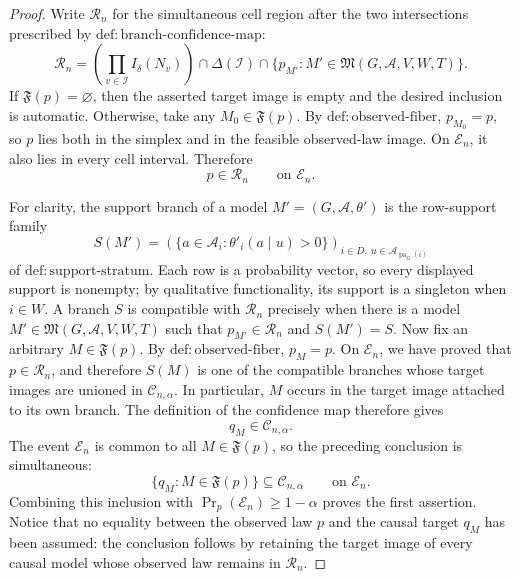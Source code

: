 \documentclass{article}
\begin{document}
\begin{proof}
Write \(\mathcal R_n\) for the simultaneous cell region after the two intersections prescribed by \(\mathrm{def:branch\text{-}confidence\text{-}map}\):
\[
 \mathcal R_n=
 \left(\prod_{v\in\mathcal I}I_\delta(N_v)\right)
 \cap\Delta(\mathcal I)
 \cap\{p_{M'}:M'\in\mathfrak M(G,\mathcal A,V,W,T)\}.
\]
If \(\mathfrak F(p)=\varnothing\), then the asserted target image is empty and the desired inclusion is automatic.  Otherwise, take any \(M_0\in\mathfrak F(p)\).  By \(\mathrm{def:observed\text{-}fiber}\), \(p_{M_0}=p\), so \(p\) lies both in the simplex and in the feasible observed-law image.  On \(\mathcal E_n\), it also lies in every cell interval.  Therefore
\[
 p\in\mathcal R_n \qquad\text{on }\mathcal E_n.
\]

For clarity, the support branch of a model \(M'=(G,\mathcal A,\theta')\) is the row-support family
\[
 S(M')=\left(\{a\in\mathcal A_i:\theta'_i(a\mid u)>0\}\right)_{i\in D,\ u\in\mathcal A_{\operatorname{pa}_G(i)}}
\]
of \(\mathrm{def:support\text{-}stratum}\).  Each row is a probability vector, so every displayed support is nonempty; by qualitative functionality, its support is a singleton when \(i\in W\).  A branch \(S\) is compatible with \(\mathcal R_n\) precisely when there is a model \(M'\in\mathfrak M(G,\mathcal A,V,W,T)\) such that \(p_{M'}\in\mathcal R_n\) and \(S(M')=S\).  Now fix an arbitrary \(M\in\mathfrak F(p)\).  By \(\mathrm{def:observed\text{-}fiber}\), \(p_M=p\).  On \(\mathcal E_n\), we have proved that \(p\in\mathcal R_n\), and therefore \(S(M)\) is one of the compatible branches whose target images are unioned in \(\mathcal C_{n,\alpha}\).  In particular, \(M\) occurs in the target image attached to its own branch.  The definition of the confidence map therefore gives
\[
 q_M\in\mathcal C_{n,\alpha}.
\]
The event \(\mathcal E_n\) is common to all \(M\in\mathfrak F(p)\), so the preceding conclusion is simultaneous:
\[
 \{q_M:M\in\mathfrak F(p)\}
 \subseteq\mathcal C_{n,\alpha}
 \qquad\text{on }\mathcal E_n.
\]
Combining this inclusion with \(\Pr_p(\mathcal E_n)\geq1-\alpha\) proves the first assertion.  Notice that no equality between the observed law \(p\) and the causal target \(q_M\) has been assumed: the conclusion follows by retaining the target image of every causal model whose observed law remains in \(\mathcal R_n\).


\end{proof}
\end{document}
